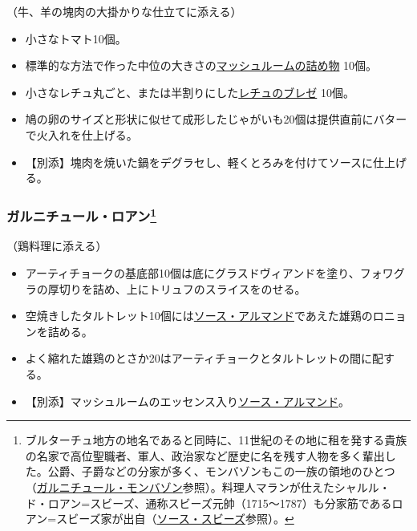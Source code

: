 \begin{recette}


（牛、羊の塊肉の大掛かりな仕立てに添える）

\begin{itemize}
\item
  小さなトマト10個。
\item
  標準的な方法で作った中位の大きさの\protect\hyperlink{champignons-farcis}{マッシュルームの詰め物}
  10個。
\item
  小さなレチュ丸ごと、または半割りにした\protect\hyperlink{laitues-braisees-au-jus}{レチュのブレゼ}
  10個。
\item
  鳩の卵のサイズと形状に似せて成形したじゃがいも20個は提供直前にバターで火入れを仕上げる。
\item
  【別添】塊肉を焼いた鍋をデグラセし、軽くとろみを付けてソースに仕上げる。
\end{itemize}

\atoaki{}

\hypertarget{garniture-rohan}{%
\subsubsection[ガルニチュール・ロアン]{\texorpdfstring{ガルニチュール・ロアン\footnote{ブルターチュ地方の地名であると同時に、11世紀のその地に租を発する貴族の名家で高位聖職者、軍人、政治家など歴史に名を残す人物を多く輩出した。公爵、子爵などの分家が多く、モンバゾンもこの一族の領地のひとつ（\protect\hyperlink{garniture-montbazon}{ガルニチュール・モンバゾン}参照）。料理人マランが仕えたシャルル・ド・ロアン=スビーズ、通称スビーズ元帥（1715〜1787）も分家筋であるロアン=スビーズ家が出自（\protect\hyperlink{sauce-soubise}{ソース・スビーズ}参照）。}}{ガルニチュール・ロアン}}\label{garniture-rohan}}



（鶏料理に添える）

\begin{itemize}
\item
  アーティチョークの基底部10個は底にグラスドヴィアンドを塗り、フォワグラの厚切りを詰め、上にトリュフのスライスをのせる。
\item
  空焼きしたタルトレット10個には\protect\hyperlink{sauce-allemande}{ソース・アルマンド}であえた雄鶏のロニョンを詰める。
\item
  よく縮れた雄鶏のとさか20はアーティチョークとタルトレットの間に配する。
\item
  【別添】マッシュルームのエッセンス入り\protect\hyperlink{sauce-allemande}{ソース・アルマンド}。
\end{itemize}


\end{recette}
